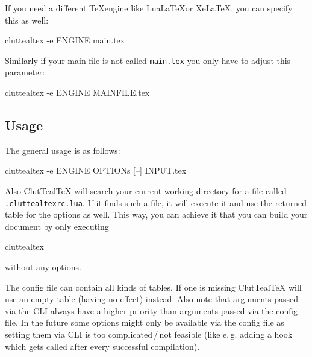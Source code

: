 \documentclass[a4paper, 11pt]{scrartcl}
\newcommand\eg{e.\,g.\xspace}
\newcommand\CluttealTeX{ClutTeal\TeX\xspace}
\begin{document}
If you need a different \TeX engine like Lua\LaTeX or Xe\LaTeX, you can specify this as well:
\begin{boxcmd}
  cluttealtex -e ENGINE main.tex
\end{boxcmd}

Similarly if your main file is not called \texttt{main.tex} you only have to adjust this parameter:
\begin{boxcmd}
  cluttealtex -e ENGINE MAINFILE.tex
\end{boxcmd}

\subsection{Usage}
The general usage is as follows:
\begin{boxcmd}
  cluttealtex -e ENGINE OPTIONs [--] INPUT.tex
\end{boxcmd}

Also \CluttealTeX will search your current working directory for a file called \texttt{.cluttealtexrc.lua}.
If it finds such a file, it will execute it and use the returned table for the options as well.
This way, you can achieve it that you can build your document by only executing
\begin{boxcmd}
	cluttealtex
\end{boxcmd}
without any options.

The config file can contain all kinds of tables.
If one is missing \CluttealTeX will use an empty table (having no effect) instead.
Also note that arguments passed via the CLI always have a higher priority than arguments passed via the config file.
In the future some options might only be available via the config file as setting them via CLI is too complicated\,/\,not feasible (like \eg adding a hook which gets called after every successful compilation).
\end{document}

